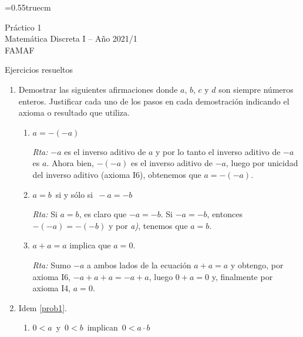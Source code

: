 \documentclass[a4paper,12pt,twoside,spanish,reqno]{amsbook}
\numberwithin{equation}{section}
\newcommand{\rta}{\noindent\textit{Rta: }}
\begin{document}
    \baselineskip=0.55truecm %
    

    
    
    {\bf \begin{center} Práctico 1 \\ Matemática Discreta I -- Año 2021/1 \\ FAMAF \end{center}}
    
    {\bf \begin{center} Ejercicios resueltos \end{center}}
    
    
    
    \begin{enumerate}
    \setlength\itemsep{1.1em}
        
        \item\label{prob1} Demostrar las siguientes afirmaciones donde $a$, $b$, $c$ y $d$ son siempre números enteros. Justificar cada uno de los pasos en cada demostración indicando el axioma o resultado que utiliza.
        \begin{enumerate}
            \item  $a=-(-a)$
            
            \rta $-a$  es el inverso aditivo de $a$ y por lo tanto el inverso aditivo de $-a$ es $a$.  Ahora bien, $-(-a)$  es el inverso aditivo de  $-a$, luego por  unicidad del inverso aditivo (axioma { I6}), obtenemos que $a = -(-a)$.
            
            \item  $a=b\,$ si y sólo si $\,-a=-b$
            
            \rta Si  $a=b$, es claro que $-a=-b$. Si $-a= -b$, entonces $-(-a) = -(-b)$ y  por \textit{a)}, tenemos que $a=b$.  
            
            \item  $a+a=a$ implica que  $a=0$.
            
            \rta Sumo $-a$ a ambos lados de la ecuación  $a+a=a$ y obtengo, por axioma I6,  $-a + a + a = -a +a$, luego $0 +a = 0$ y, finalmente por axioma I4, $a=0$. 
            
        \end{enumerate}
        
        
        \medskip
        
        \item Idem \ref{prob1}.
        
        \begin{enumerate}
            \item $0<a\,$ y $\,0<b\,$ implican $\,0<a\cdot b$
            

\end{enumerate}
\end{enumerate}
\end{document}
